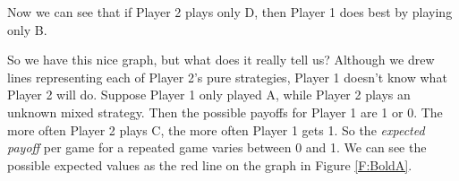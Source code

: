 \begin{itemize}
\begin{itemize}
\begin{figure}
\begin{center}
   \label{F:MixedStrategyTwoLines}
\end{center}   
\end{figure}

Now we can see that if Player 2 plays only D, then Player 1 does best by playing only B.
\end{itemize}

\end{itemize}

So we have this nice graph, but what does it really tell us? Although we drew lines representing each of Player 2's pure strategies, Player 1 doesn't know what Player 2 will do. Suppose Player 1 only played A, while Player 2 plays an unknown mixed strategy. Then the possible payoffs for Player 1 are 1 or 0. The more often Player 2 plays C, the more often Player 1 gets 1. So the \emph{expected payoff} per game for a repeated game varies between 0 and 1. We can see the possible expected values as the red line on the graph in Figure \ref{F:BoldA}.


